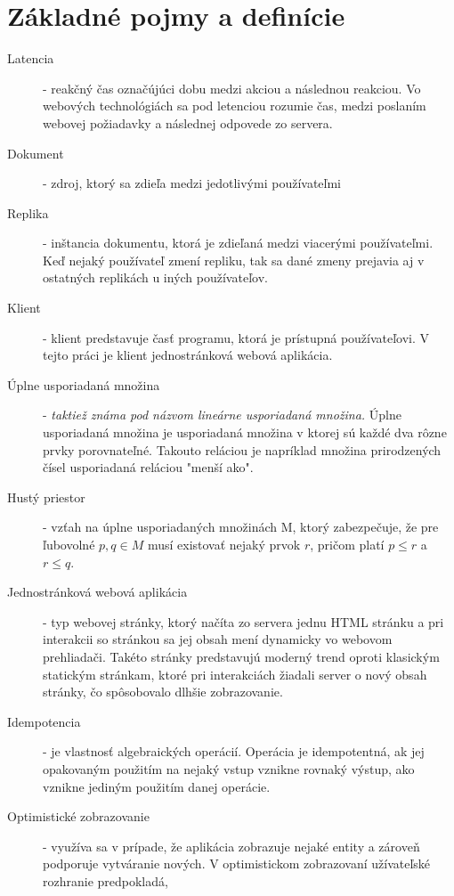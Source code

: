 \chapter{Základné pojmy a definície}

\label{kap:zakladne} %

\begin{description}
\item [Latencia] - reakčný čas označújúci dobu medzi akciou a následnou reakciou. Vo webových 
technológiách sa pod letenciou rozumie čas, medzi poslaním webovej požiadavky a následnej
odpovede zo servera.
\item [Dokument] - zdroj, ktorý sa zdieľa medzi jedotlivými používateľmi
\item [Replika] - inštancia dokumentu, ktorá je zdieľaná medzi viacerými používateľmi. Keď nejaký
používateľ zmení repliku, tak sa dané zmeny prejavia aj v ostatných replikách u iných
používateľov.
\item [Klient] - klient predstavuje časť programu, ktorá je prístupná používateľovi. V tejto práci
je klient jednostránková webová aplikácia.
\item [Úplne usporiadaná množina] - \textit{taktiež známa pod názvom lineárne usporiadaná množina.} 
Úplne usporiadaná množina je usporiadaná množina v ktorej sú každé dva rôzne prvky porovnateľné. 
Takouto reláciou je napríklad množina prirodzených čísel usporiadaná reláciou "menší ako".
\item [Hustý priestor] - vzťah na úplne usporiadaných množinách M, ktorý zabezpečuje, že pre 
ľubovolné $p, q \in M$ musí existovať nejaký prvok $r$, pričom platí $p \leq r$ a 
$r \leq q$.
\item [Jednostránková webová aplikácia] - typ webovej stránky, ktorý načíta zo servera jednu HTML
stránku a pri interakcii so stránkou sa jej obsah mení dynamicky vo webovom prehliadači. Takéto
stránky predstavujú moderný trend oproti klasickým statickým stránkam, ktoré pri interakciách
žiadali server o nový obsah stránky, čo spôsobovalo dlhšie zobrazovanie.
\item [Idempotencia] - je vlastnosť algebraických operácií. Operácia je idempotentná, ak jej
opakovaným použitím na nejaký vstup vznikne rovnaký výstup, ako vznikne jediným použitím danej
operácie.
\item [Optimistické zobrazovanie] - využíva sa v prípade, že aplikácia zobrazuje nejaké entity a
zároveň podporuje vytváranie nových. V optimistickom zobrazovaní užívateľské rozhranie predpokladá,

\end{description}
